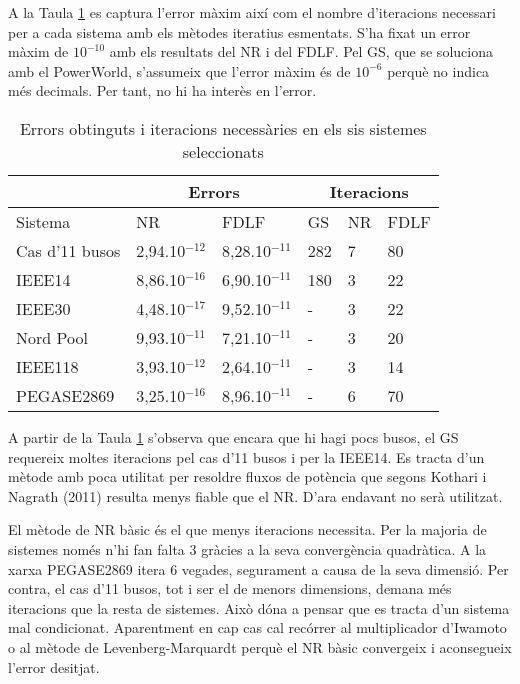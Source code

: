 A la Taula \ref{tab:solucio_iteratius1} es captura l'error màxim així com el nombre d'iteracions necessari per a cada sistema amb els mètodes iteratius esmentats. S'ha fixat un error màxim de $10^{-10}$ amb els resultats del NR i del FDLF. Pel GS, que se soluciona amb el PowerWorld, s'assumeix que l'error màxim és de $10^{-6}$ perquè no indica més decimals. Per tant, no hi ha interès en l'error.

\begin{table}[!htb]
  \begin{center}
  \begin{tabular}{llllll}
  \hline
   & \multicolumn{2}{c}{Errors} & \multicolumn{3}{c}{Iteracions} \\
  \hline
  Sistema & NR & FDLF & GS & NR & FDLF\\
  \hline
  \hline
  Cas d'11 busos & 2,94.10$^{-12}$ & 8,28.10$^{-11}$ & 282 & 7 & 80\\
  IEEE14 & 8,86.10$^{-16}$& 6,90.10$^{-11}$ & 180 & 3 & 22\\
  IEEE30 & 4,48.10$^{-17}$ & 9,52.10$^{-11}$ & - & 3 & 22\\
  Nord Pool & 9,93.10$^{-11}$ & 7,21.10$^{-11}$ & - & 3 & 20\\
  IEEE118 & 3,93.10$^{-12}$ & 2,64.10$^{-11}$ & - & 3 & 14\\
  PEGASE2869 & 3,25.10$^{-16}$ & 8,96.10$^{-11}$ & - & 6 & 70\\ 
  \hline 
  \end{tabular}
  \caption{Errors obtinguts i iteracions necessàries en els sis sistemes seleccionats}
  \label{tab:solucio_iteratius1}
  \end{center}
\end{table}

A partir de la Taula \ref{tab:solucio_iteratius1} s'observa que encara que hi hagi pocs busos, el GS requereix moltes iteracions pel cas d'11 busos i per la IEEE14. Es tracta d'un mètode amb poca utilitat per resoldre fluxos de potència que segons Kothari i Nagrath (2011) resulta menys fiable que el NR. D'ara endavant no serà utilitzat.

El mètode de NR bàsic és el que menys iteracions necessita. Per la majoria de sistemes només n'hi fan falta 3 gràcies a la seva convergència quadràtica. A la xarxa PEGASE2869 itera 6 vegades, segurament a causa de la seva dimensió. Per contra, el cas d'11 busos, tot i ser el de menors dimensions, demana més iteracions que la resta de sistemes. Això dóna a pensar que es tracta d'un sistema mal condicionat. Aparentment en cap cas cal recórrer al multiplicador d'Iwamoto o al mètode de Levenberg-Marquardt perquè el NR bàsic convergeix i aconsegueix l'error desitjat.

